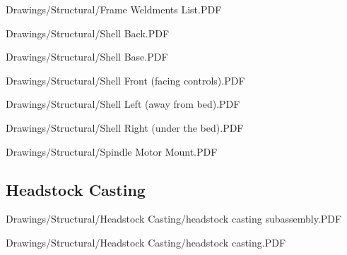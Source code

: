 
{Drawings/Structural/Frame Weldments List.PDF}


{Drawings/Structural/Shell Back.PDF}


{Drawings/Structural/Shell Base.PDF}


{Drawings/Structural/Shell Front (facing controls).PDF}


{Drawings/Structural/Shell Left (away from bed).PDF}


{Drawings/Structural/Shell Right (under the bed).PDF}


{Drawings/Structural/Spindle Motor Mount.PDF}

\subsection{Headstock Casting}


{Drawings/Structural/Headstock Casting/headstock casting subassembly.PDF}


{Drawings/Structural/Headstock Casting/headstock casting.PDF}

